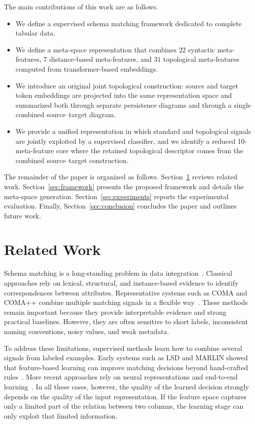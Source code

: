\documentclass[sigconf, nonacm]{acmart}
\begin{document}
The main contributions of this work are as follows.
\begin{itemize}[leftmargin=*]
    \item We define a supervised schema matching framework dedicated to complete tabular data.
    \item We define a meta-space representation that combines \(22\) syntactic meta-features, \(7\) distance-based meta-features, and \(31\) topological meta-features computed from transformer-based embeddings.
    \item We introduce an original joint topological construction: source and target token embeddings are projected into the same representation space and summarized both through separate persistence diagrams and through a single combined source--target diagram.
    \item We provide a unified representation in which standard and topological signals are jointly exploited by a supervised classifier, and we identify a reduced 10-meta-feature core where the retained topological descriptor comes from the combined source--target construction.
\end{itemize}

The remainder of the paper is organized as follows. Section~\ref{sec:related} reviews related work. Section~\ref{sec:framework} presents the proposed framework and details the meta-space generation. Section~\ref{sec:experiments} reports the experimental evaluation. Finally, Section~\ref{sec:conclusion} concludes the paper and outlines future work.

\section{Related Work}
\label{sec:related}

Schema matching is a long-standing problem in data integration~\cite{rahm2001survey,dong2015big}. Classical approaches rely on lexical, structural, and instance-based evidence to identify correspondences between attributes. Representative systems such as COMA and COMA++ combine multiple matching signals in a flexible way~\cite{do2002coma,aumueller2005coma}. These methods remain important because they provide interpretable evidence and strong practical baselines. However, they are often sensitive to short labels, inconsistent naming conventions, noisy values, and weak metadata.

To address these limitations, supervised methods learn how to combine several signals from labeled examples. Early systems such as LSD and MARLIN showed that feature-based learning can improve matching decisions beyond hand-crafted rules~\cite{doan2003learning,bilke2005marlin}. More recent approaches rely on neural representations and end-to-end learning~\cite{mudgal2018deepmatcher}. In all these cases, however, the quality of the learned decision strongly depends on the quality of the input representation. If the feature space captures only a limited part of the relation between two columns, the learning stage can only exploit that limited information.
\end{document}
